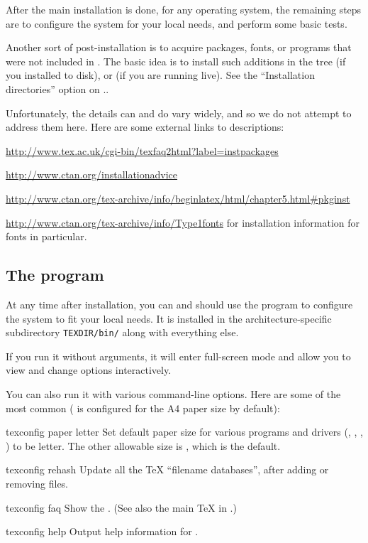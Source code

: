 \documentclass{article}
\begin{document}
After the main installation is done, for any operating system, the
remaining steps are to configure the system for your local needs, and
perform some basic tests.

Another sort of post-installation is to acquire packages, fonts, or
programs that were not included in \TL{}.  The basic idea is to
install such additions in the  tree (if you
installed to disk), or  (if you are running live).
See the ``Installation directories'' option on \p.\pageref{text:instdir}.

Unfortunately, the details can and do vary widely, and so we do not attempt to
address them here.  Here are some external links to descriptions:
\begin{itemize*}
\item
\url{http://www.tex.ac.uk/cgi-bin/texfaq2html?label=instpackages}
\item
\url{http://www.ctan.org/installationadvice}
\item
\url{http://www.ctan.org/tex-archive/info/beginlatex/html/chapter5.html#pkginst}
\item
\url{http://www.ctan.org/tex-archive/info/Type1fonts} for
installation information for fonts in particular.
\end{itemize*}


\subsection{The \protect{} program}
\label{sec:texconfig}

At any time after installation, you can and should use the program
 to configure the system to fit your local needs.  It
is installed in the architecture-specific subdirectory
\texttt{TEXDIR/bin/} along with everything else.

If you run it without arguments, it will enter full-screen mode and
allow you to view and change options interactively.

You can also run it with various command-line options.  Here are some of
the most common (\TL{} is configured for the A4 paper size by default):

\begin{ttdescription}

\item [texconfig paper letter] Set default paper size for
various programs and drivers (, ,
, ) to be  letter.  The other
allowable size is , which is the default.

\item [texconfig rehash] Update all the \TeX{} ``filename databases'',
after adding or removing files.

\item [texconfig faq] Show the \teTeX{} .
(See also the main \TeX{}  in .)

\item [texconfig help] Output help information for .

\end{ttdescription}
\end{document}
